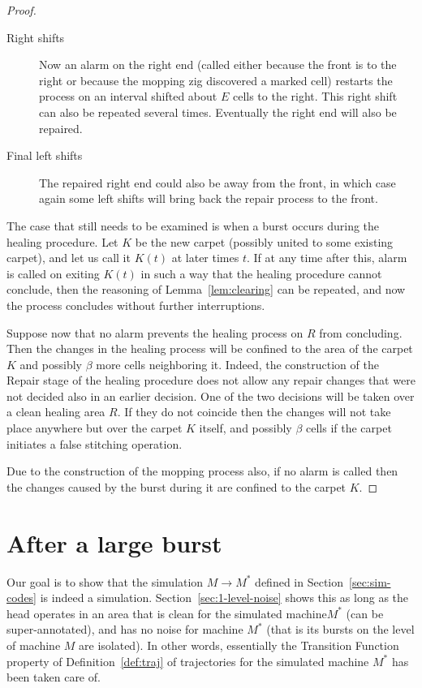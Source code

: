 \documentclass[12pt]{memoir}
\newcommand{\E}{E}
\begin{document}
\begin{proof}
\begin{description}
\item[Right shifts] Now an alarm on the right end (called either because
the front is to the right or because the mopping zig discovered a marked cell)
restarts the process on an interval shifted about \( \E \) cells to the right.
This right shift can also be repeated several times.
Eventually the right end will also be repaired.

\item[Final left shifts]
The repaired right end could also be away from the front, in which case
again some left shifts will bring back the repair process to the front.
\end{description}

The case that still needs to be examined is when a burst occurs
during the healing procedure.
Let \( K \) be the new carpet (possibly united to some existing carpet),
and let us call it \( K(t) \) at later times \( t \).
If at any time after this, alarm is called on exiting \( K(t) \)  in such
a way that the healing procedure cannot conclude,
then the reasoning of Lemma~\ref{lem:clearing} can be repeated,
and now the process concludes without further interruptions. 

Suppose now that no alarm prevents the healing process on \( R \)
from concluding.
Then the changes in the healing process will be confined to the area of the
carpet \( K \) and possibly \( \beta \) more cells neighboring it.
Indeed, the construction of the Repair stage of the healing procedure
does not allow any repair changes that were not decided also in an earlier
decision.
One of the two decisions will be taken over a clean healing area \( R \).
If they do not coincide then the changes will not take place anywhere but
over the carpet \( K \) itself, and possibly \( \beta \) cells if the carpet
initiates a false stitching operation.

Due to the construction of the mopping process also,
if no alarm is called then the changes caused by the burst
during it are confined to the carpet \( K \).
\end{proof}


\section{After a large burst}

Our goal is to show that the simulation \( M\to M^{*} \)
defined in Section~\ref{sec:sim-codes} is indeed a simulation.
Section~\ref{sec:1-level-noise} shows this as long as the head operates in an
area that is clean for the simulated machine\( M^{*} \) (can be super-annotated), 
and has no noise for machine \( M^{*} \) (that is its bursts on the level of machine \( M \)
are isolated).
In other words, essentially the Transition Function property of Definition~\ref{def:traj} of
trajectories for the simulated machine \( M^{*} \) has been taken care of.
\end{document}
